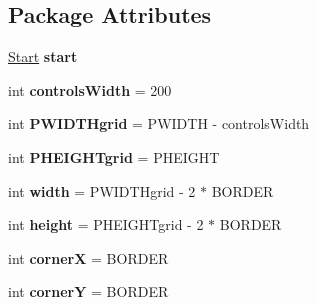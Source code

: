 \subsection*{Package Attributes}
\begin{DoxyCompactItemize}
\item 
\hypertarget{classbrick_breaker_1_1_level_editor_aaf99b1a788cb08d4a06f09e9bd3082ad}{
\hyperlink{classbrick_breaker_1_1_start}{Start} {\bfseries start}}
\label{classbrick_breaker_1_1_level_editor_aaf99b1a788cb08d4a06f09e9bd3082ad}

\item 
\hypertarget{classbrick_breaker_1_1_level_editor_a8ec9fae1671c98901c3b475380165394}{
int {\bfseries controlsWidth} = 200}
\label{classbrick_breaker_1_1_level_editor_a8ec9fae1671c98901c3b475380165394}

\item 
\hypertarget{classbrick_breaker_1_1_level_editor_afe941ba43411113e8839d2dd096b778d}{
int {\bfseries PWIDTHgrid} = PWIDTH -\/ controlsWidth}
\label{classbrick_breaker_1_1_level_editor_afe941ba43411113e8839d2dd096b778d}

\item 
\hypertarget{classbrick_breaker_1_1_level_editor_a8a906ab44e70601e3446f932db1bb751}{
int {\bfseries PHEIGHTgrid} = PHEIGHT}
\label{classbrick_breaker_1_1_level_editor_a8a906ab44e70601e3446f932db1bb751}

\item 
\hypertarget{classbrick_breaker_1_1_level_editor_ae0935f24f6b63be4738e299ed28786f0}{
int {\bfseries width} = PWIDTHgrid -\/ 2 $\ast$ BORDER}
\label{classbrick_breaker_1_1_level_editor_ae0935f24f6b63be4738e299ed28786f0}

\item 
\hypertarget{classbrick_breaker_1_1_level_editor_a769656f5f7b9751913a165d0292640d3}{
int {\bfseries height} = PHEIGHTgrid -\/ 2 $\ast$ BORDER}
\label{classbrick_breaker_1_1_level_editor_a769656f5f7b9751913a165d0292640d3}

\item 
\hypertarget{classbrick_breaker_1_1_level_editor_ae0a1406b008ab8782766cea7ce5a212e}{
int {\bfseries cornerX} = BORDER}
\label{classbrick_breaker_1_1_level_editor_ae0a1406b008ab8782766cea7ce5a212e}

\item 
\hypertarget{classbrick_breaker_1_1_level_editor_a11ad3d9dc458a90fa53308bc016e55e9}{
int {\bfseries cornerY} = BORDER}
\label{classbrick_breaker_1_1_level_editor_a11ad3d9dc458a90fa53308bc016e55e9}


\end{DoxyCompactItemize}
